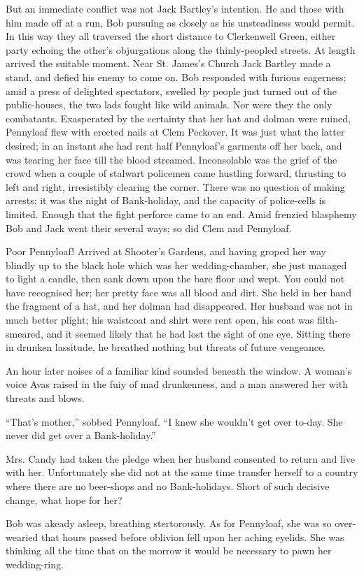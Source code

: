 But an immediate conflict was not Jack Bartley's intention. He and those
with him made off at a run, Bob pursuing as closely as his unsteadiness
would permit. In this way they all traversed the short distance to
Clerkenwell Green, either party echoing the other's objurgations along
the thinly-peopled streets. At length arrived the suitable moment. Near
St. James's Church Jack Bartley made a stand, and defied his enemy to
come on. Bob responded with furious eagerness; amid a press of delighted
spectators, swelled by people just turned out of the public-houses, the
two lads {}fought like wild animals. Nor were they the only combatants.
Exasperated by the certainty that her hat and dolman were ruined,
Pennyloaf flew with erected nails at Clem Peckover. It was just what the
latter desired; in an instant she had rent half Pennyloaf's garments off
her back, and was tearing her face till the blood streamed. Inconsolable
was the grief of the crowd when a couple of stalwart policemen came
hustling forward, thrusting to left and right, irresistibly clearing the
corner. There was no question of making arrests; it was the night of
Bank-holiday, and the capacity of police-cells is limited. Enough that
the fight perforce came to an end. Amid frenzied blasphemy Bob and Jack
went their several ways; so did Clem and Pennyloaf.

Poor Pennyloaf! Arrived at Shooter's Gardens, and having groped her way
blindly up to the black hole which was her wedding-chamber, she just
managed to light a candle, then sank down upon the bare floor and wept.
You could not have recognised her; her pretty face was all blood and
dirt. She held in her {}hand the fragment of a hat, and her dolman had
disappeared. Her husband was not in much better plight; his waistcoat
and shirt were rent open, his coat was filth-smeared, and it seemed
likely that he had lost the sight of one eye. Sitting there in drunken
lassitude, he breathed nothing but threats of future vengeance.

An hour later noises of a familiar kind sounded beneath the window. A
woman's voice Avas raised in the fuiy of mad drunkenness, and a man
answered her with threats and blows.

``That's mother,'' sobbed Pennyloaf. ``I knew she wouldn't get over
to-day. She never did get over a Bank-holiday.''

Mrs. Candy had taken the pledge when her husband consented to return and
live with her. Unfortunately she did not at the same time transfer
herself to a country where there are no beer-shops and no Bank-holidays.
Short of such decisive change, what hope for her?

Bob was akeady asleep, breathing {}stertorously. As for Pennyloaf, she
was so over-wearied that hours passed before oblivion fell upon her
aching eyelids. She was thinking all the time that on the morrow it
would be necessary to pawn her wedding-ring.
